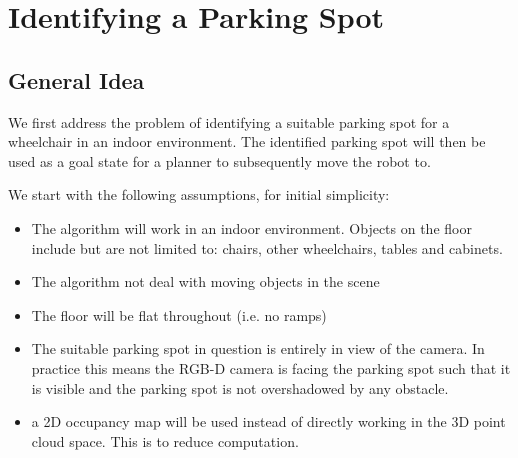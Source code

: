 \chapter{Identifying a Parking Spot}


\section{General Idea}
We first address the problem of identifying a suitable parking spot for a
wheelchair in an indoor environment. The identified parking spot will then be
used as a goal state for a planner to subsequently move the robot to.

We start with the following assumptions, for initial simplicity:
\begin{itemize}
\item The algorithm will work in an indoor environment. Objects on the floor
include but are not limited to: chairs, other wheelchairs, tables and cabinets.
\item The algorithm not deal with moving objects in the scene
\item The floor will be flat throughout (i.e. no ramps)
\item The suitable parking spot in question is entirely in view of the camera.
In practice this means the RGB-D camera is facing the parking spot such that
it is visible and the parking spot is not overshadowed by any obstacle.
\item a 2D occupancy map will be used instead of directly working in the 3D
point cloud space. This is to reduce computation.
\end{itemize}

